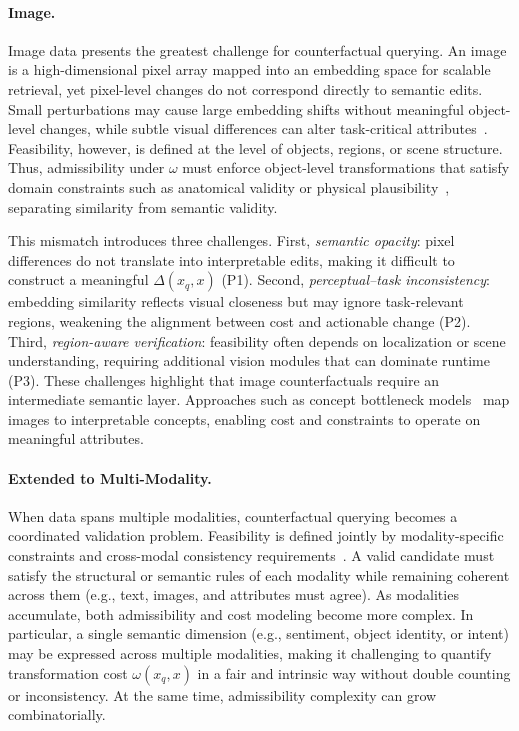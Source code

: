 \paragraph{Image.}
Image data presents the greatest challenge for counterfactual querying. An image is a high-dimensional pixel array mapped into an embedding space for scalable retrieval, yet pixel-level changes do not correspond directly to semantic edits. Small perturbations may cause large embedding shifts without meaningful object-level changes, while subtle visual differences can alter task-critical attributes~\cite{narodytska2017simple}. Feasibility, however, is defined at the level of objects, regions, or scene structure. Thus, admissibility under $\omega$ must enforce object-level transformations that satisfy domain constraints such as anatomical validity or physical plausibility~\cite{nam2026causal}, separating similarity from semantic validity.

This mismatch introduces three challenges. First, \emph{semantic opacity}: pixel differences do not translate into interpretable edits, making it difficult to construct a meaningful $\Delta(x_q,x)$ (P1). Second, \emph{perceptual–task inconsistency}: embedding similarity reflects visual closeness but may ignore task-relevant regions, weakening the alignment between cost and actionable change (P2). Third, \emph{region-aware verification}: feasibility often depends on localization or scene understanding, requiring additional vision modules that can dominate runtime (P3). These challenges highlight that image counterfactuals require an intermediate semantic layer. Approaches such as concept bottleneck models~\cite{de2025causally,koh2020concept,dominici2025counterfactual} map images to interpretable concepts, enabling cost and constraints to operate on meaningful attributes.


\paragraph{Extended to Multi-Modality.}
When data spans multiple modalities, counterfactual querying becomes a coordinated validation problem. Feasibility is defined jointly by modality-specific constraints and cross-modal consistency requirements~\cite{chen2019cross}. A valid candidate must satisfy the structural or semantic rules of each modality while remaining coherent across them (e.g., text, images, and attributes must agree). As modalities accumulate, both admissibility and cost modeling become more complex. In particular, a single semantic dimension (e.g., sentiment, object identity, or intent) may be expressed across multiple modalities, making it challenging to quantify transformation cost $\omega(x_q,x)$ in a fair and intrinsic way without double counting or inconsistency. At the same time, admissibility complexity can grow combinatorially.

